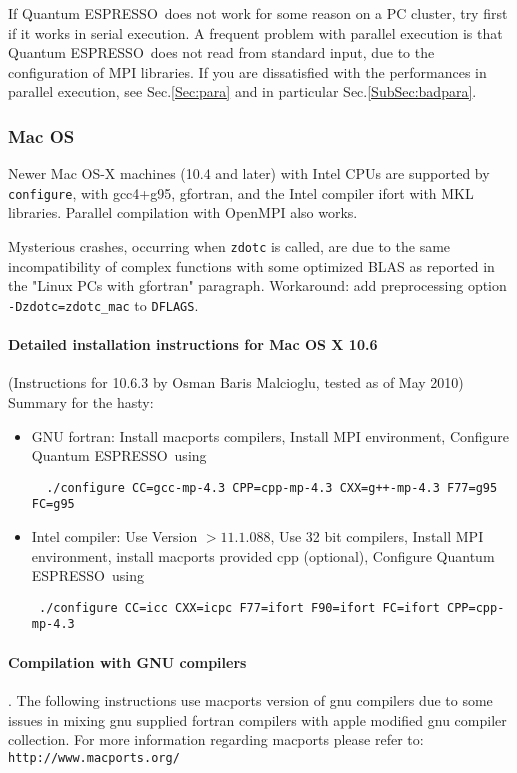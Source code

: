 \documentclass[12pt,a4paper]{article}
\def\qe{{\sc Quantum ESPRESSO}}
\def\configure{\texttt{configure}}
\begin{document}
If \qe\ does not work for some reason on a PC cluster,
try first if it works in serial execution. A frequent problem with parallel
execution is that \qe\ does not read from standard input,
due to the configuration of MPI libraries.
If you are dissatisfied with the performances in parallel execution,
see Sec.\ref{Sec:para} and in particular Sec.\ref{SubSec:badpara}.

\subsubsection{Mac OS}

Newer Mac OS-X machines (10.4 and later) with Intel CPUs are supported 
by \configure,
with gcc4+g95, gfortran, and the Intel compiler ifort with MKL libraries.
Parallel compilation with OpenMPI also works. 

Mysterious crashes, occurring when \texttt{zdotc} is called, are due
to the same incompatibility of complex functions with some optimized 
BLAS as reported in the "Linux PCs with gfortran" paragraph. Workaround:
add preprocessing option \texttt{-Dzdotc=zdotc\_mac} to \texttt{DFLAGS}.

\paragraph{Detailed installation instructions for Mac OS X 10.6}

(Instructions for 10.6.3 by Osman Baris Malcioglu, tested as of May 2010)
Summary for the hasty: 
\begin{itemize}
\item GNU fortran:
Install macports compilers, 
Install MPI environment,
Configure \qe\  using
\begin{verbatim}
  ./configure CC=gcc-mp-4.3 CPP=cpp-mp-4.3 CXX=g++-mp-4.3 F77=g95 FC=g95
\end{verbatim}
\item Intel compiler:
Use Version $>11.1.088$,
Use 32 bit compilers,
Install MPI environment,
install macports provided cpp (optional),
Configure \qe\ using
\begin{verbatim}
 ./configure CC=icc CXX=icpc F77=ifort F90=ifort FC=ifort CPP=cpp-mp-4.3
\end{verbatim}
\end{itemize}

\paragraph{Compilation with GNU compilers}.
The following instructions use macports version of gnu compilers due to some
issues in mixing gnu supplied fortran compilers with apple modified gnu compiler
collection. For more information regarding macports please refer to:
\texttt{http://www.macports.org/}  
\end{document}
